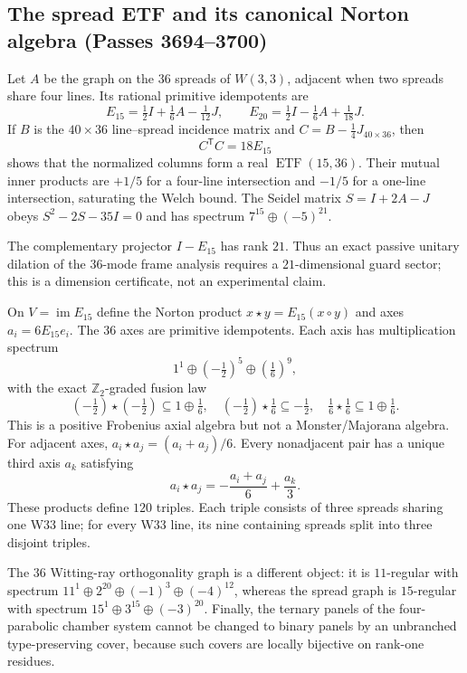 \subsection{The spread ETF and its canonical Norton algebra (Passes 3694--3700)}
\label{sec:spread-etf-norton}
Let $A$ be the graph on the $36$ spreads of $W(3,3)$, adjacent when two
spreads share four lines. Its rational primitive idempotents are
\[
 E_{15}=\tfrac12I+\tfrac16A-\tfrac1{12}J,
 \qquad
 E_{20}=\tfrac12I-\tfrac16A+\tfrac1{18}J.
\]
If $B$ is the $40\times36$ line--spread incidence matrix and
$C=B-\frac14J_{40\times36}$, then
\[
 \boxed{C^{\mathsf T}C=18E_{15}}
\]
shows that the normalized columns form a real $\operatorname{ETF}(15,36)$.
Their mutual inner products are $+1/5$ for a four-line intersection and
$-1/5$ for a one-line intersection, saturating the Welch bound. The Seidel
matrix $S=I+2A-J$ obeys $S^2-2S-35I=0$ and has spectrum
$7^{15}\oplus(-5)^{21}$.

The complementary projector $I-E_{15}$ has rank $21$. Thus an exact passive
unitary dilation of the $36$-mode frame analysis requires a $21$-dimensional
guard sector; this is a dimension certificate, not an experimental claim.

On $V=\operatorname{im}E_{15}$ define the Norton product
$x\star y=E_{15}(x\circ y)$ and axes $a_i=6E_{15}e_i$. The $36$ axes are
primitive idempotents. Each axis has multiplication spectrum
\[
 1^1\oplus(-\tfrac12)^5\oplus(\tfrac16)^9,
\]
with the exact $\mathbb Z_2$-graded fusion law
\[
(-\tfrac12)\star(-\tfrac12)\subseteq 1\oplus\tfrac16,
\quad
(-\tfrac12)\star\tfrac16\subseteq-\tfrac12,
\quad
\tfrac16\star\tfrac16\subseteq1\oplus\tfrac16.
\]
This is a positive Frobenius axial algebra but not a Monster/Majorana algebra.
For adjacent axes, $a_i\star a_j=(a_i+a_j)/6$. Every nonadjacent pair has a
unique third axis $a_k$ satisfying
\[
 a_i\star a_j=-\frac{a_i+a_j}{6}+\frac{a_k}{3}.
\]
These products define $120$ triples. Each triple consists of three spreads
sharing one W33 line; for every W33 line, its nine containing spreads split
into three disjoint triples.

The $36$ Witting-ray orthogonality graph is a different object: it is
$11$-regular with spectrum $11^1\oplus2^{20}\oplus(-1)^3\oplus(-4)^{12}$,
whereas the spread graph is $15$-regular with spectrum
$15^1\oplus3^{15}\oplus(-3)^{20}$. Finally, the ternary panels of the
four-parabolic chamber system cannot be changed to binary panels by an
unbranched type-preserving cover, because such covers are locally bijective
on rank-one residues.

